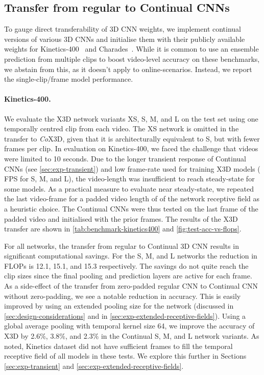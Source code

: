 \documentclass[runningheads]{llncs}
\begin{document}
\vspace{-2mm}
\subsection{Transfer from regular to Continual CNNs} \label{exp:transfer-reg-to-co}
\vspace{-1mm}
To gauge direct transferability of 3D CNN weights, we implement continual versions of various 3D CNNs and initialise them with their publicly available weights for Kinetics-400~\cite{kay2017kinetics} and Charades~\cite{sigurdsson2016charades}. While it is common to use an ensemble prediction from multiple clips to boost video-level accuracy on these benchmarks, we abstain from this, as it doesn't apply to online-scenarios. Instead, we report the single-clip/frame model performance. 

\paragraph{Kinetics-400.}
We evaluate the X3D network variants XS, S, M, and L on the test set using one temporally centred clip from each video. 
The XS network is omitted in the transfer to \textit{Co}X3D, given that it is architecturally equivalent to S, but with fewer frames per clip. 
In evaluation on Kinetics-400, we faced the challenge that videos were limited to 10 seconds. 
Due to the longer transient response of Continual CNNs (see \cref{sec:exp-transient}) and low frame-rate used for training X3D models ( FPS for S, M, and L), the video-length was insufficient to reach steady-state for some models.
As a practical measure to evaluate near steady-state, we repeated the last video-frame for a padded video length of  of the network receptive field as a heuristic choice.
The Continual CNNs were thus tested on the last frame of the padded video and initialised with the prior frames. 
The results of the X3D transfer are shown in \cref{tab:benchmark-kinetics400} and \cref{fig:test-acc-vs-flops}.





For all networks, the transfer from regular to Continual 3D CNN results in significant computational savings. 
For the S, M, and L networks the reduction in FLOPs is 12.1, 15.1, and 15.3 respectively.
The savings do not quite reach the clip sizes since the final pooling and prediction layers are active for each frame.
As a side-effect of the transfer from zero-padded regular CNN to Continual CNN without zero-padding, we see a notable reduction in accuracy. 
This is easily improved by using an extended pooling size for the network (discussed in \cref{sec:design-considerations} and in \cref{sec:exp-extended-receptive-fields}). 
Using a global average pooling with temporal kernel size 64, we improve the accuracy of X3D by 2.6\%, 3.8\%, and 2.3\% in the Continual S, M, and L network variants.
As noted, Kinetics dataset did not have sufficient frames to fill the temporal receptive field of all models in these tests.
We explore this further in Sections \ref{sec:exp-transient} and \ref{sec:exp-extended-receptive-fields}. 
\end{document}

